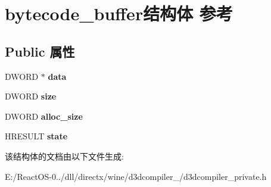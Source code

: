 \hypertarget{structbytecode__buffer}{}\section{bytecode\+\_\+buffer结构体 参考}
\label{structbytecode__buffer}
\subsection*{Public 属性}
\begin{DoxyCompactItemize}
\item 
\mbox{\label{structbytecode__buffer_a4f6455d0e323c0a2bc4662a2a17594eb}} 
D\+W\+O\+RD $\ast$ {\bfseries data}
\item 
\mbox{\label{structbytecode__buffer_a3d1e7a5bdcc283e4834fa48b87d6e230}} 
D\+W\+O\+RD {\bfseries size}
\item 
\mbox{\label{structbytecode__buffer_ab6d0b0693987e2719c71edd63f584960}} 
D\+W\+O\+RD {\bfseries alloc\+\_\+size}
\item 
\mbox{\label{structbytecode__buffer_ab7dcaefb75af13ed17fea2ed2963d199}} 
H\+R\+E\+S\+U\+LT {\bfseries state}
\end{DoxyCompactItemize}


该结构体的文档由以下文件生成\+:\begin{DoxyCompactItemize}
\item 
E\+:/\+React\+O\+S-\/0../dll/directx/wine/d3dcompiler\+\_/d3dcompiler\+\_\+private.\+h\end{DoxyCompactItemize}

